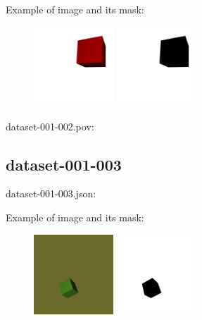 Example of image and its mask:
\begin{center}
\begin{figure}[H]
\centering\includegraphics[width=3cm]{./img-001-002.png}
\centering\includegraphics[width=3cm]{./mask-001-002.png}
\end{figure}
\end{center}

dataset-001-002.pov:
\begin{scriptsize}
\begin{ttfamily}

\end{ttfamily}
\end{scriptsize}

\subsection{dataset-001-003}

dataset-001-003.json:
\begin{scriptsize}
\begin{ttfamily}

\end{ttfamily}
\end{scriptsize}

Example of image and its mask:
\begin{center}
\begin{figure}[H]
\centering\includegraphics[width=3cm]{./img-001-003.png}
\centering\includegraphics[width=3cm]{./mask-001-003.png}
\end{figure}
\end{center}

